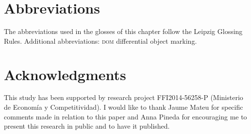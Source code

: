 \documentclass[output=paper,colorlinks,citecolor=brown,modfonts,nonflat]{langsci/langscibook}
\begin{document}
\section*{Abbreviations}
The abbreviations used in the glosses of this chapter follow the Leipzig Glossing Rules. Additional abbreviations: \textsc{dom} differential object marking.

\section*{Acknowledgments} This study has been supported by research project FFI2014-56258-P ({Ministerio de Economía y Competitividad}). I would like to thank Jaume Mateu for specific comments made in relation to this paper and Anna Pineda for encouraging me to present this research in public and to have it published.

\sloppy\printbibliography[heading=subbibliography,notkeyword=this]
\end{document}

